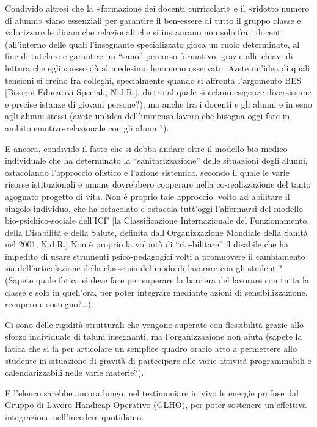 Condivido altresì che la «formazione dei docenti curricolari» e il «ridotto numero di alunni» siano essenziali per garantire il ben-essere di tutto il gruppo classe e valorizzare le dinamiche relazionali che si instaurano non solo fra i docenti (all'interno delle quali l'insegnante specializzato gioca un ruolo determinate, al fine di tutelare e garantire un “sano” percorso formativo, grazie alle chiavi di lettura che egli spesso dà al medesimo fenomeno osservato. Avete un'idea di quali tensioni si creino fra colleghi, specialmente quando si affronta l'argomento BES [Bisogni Educativi Speciali, N.d.R.], dietro al quale si celano esigenze diversissime e precise istanze di giovani persone?), ma anche fra i docenti e gli alunni e in seno agli alunni stessi (avete un'idea dell'immenso lavoro che bisogna oggi fare in ambito emotivo-relazionale con gli alunni?).

E ancora, condivido il fatto che si debba andare oltre il modello bio-medico individuale che ha determinato la “sanitarizzazione” delle situazioni degli alunni, ostacolando l'approccio olistico e l'azione sistemica, secondo il quale le varie risorse istituzionali e umane dovrebbero cooperare nella co-realizzazione del tanto agognato progetto di vita. Non è proprio tale approccio, volto ad abilitare il singolo individuo, che ha ostacolato e ostacola tutt'oggi l'affermarsi del modello bio-psichico-sociale dell'ICF [la Classificazione Internazionale del Funzionamento, della Disabilità e della Salute, definita dall'Organizzazione Mondiale della Sanità nel 2001, N.d.R.] Non è proprio la volontà di “ria-bilitare” il disabile che ha impedito di usare strumenti psico-pedagogici volti a promuovere il cambiamento sia dell'articolazione della classe sia del modo di lavorare con gli studenti? (Sapete quale fatica si deve fare per superare la barriera del lavorare con tutta la classe e solo in quell'ora, per poter integrare mediante azioni di sensibilizzazione, recupero e sostegno?…).

Ci sono delle rigidità strutturali che vengono superate con flessibilità grazie allo sforzo individuale di taluni insegnanti, ma l'organizzazione non aiuta (sapete la fatica che si fa per articolare un semplice quadro orario atto a permettere allo studente in situazione di gravità di partecipare alle varie attività programmabili e calendarizzabili nelle varie materie?).

E l'elenco sarebbe ancora lungo, nel testimoniare in vivo le energie profuse dal Gruppo di Lavoro Handicap Operativo (GLHO), per poter sostenere un'effettiva integrazione nell'incedere quotidiano.
